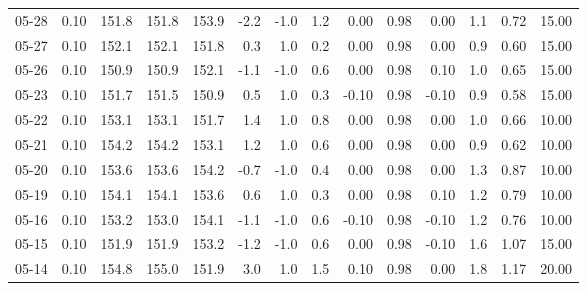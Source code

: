\begin{threeparttable}
{\begin{tabular}{lrrrrrrrrrrrrr}
  05-28 &     0.10 & 151.8 & 151.8 & 153.9 &       -2.2 &                     -1.0 &                 1.2 &       0.00 &      0.98 &           0.00 &              1.1 &            0.72 &                  15.00 \\
  05-27 &     0.10 & 152.1 & 152.1 & 151.8 &        0.3 &                      1.0 &                 0.2 &       0.00 &      0.98 &           0.00 &              0.9 &            0.60 &                  15.00 \\
  05-26 &     0.10 & 150.9 & 150.9 & 152.1 &       -1.1 &                     -1.0 &                 0.6 &       0.00 &      0.98 &           0.10 &              1.0 &            0.65 &                  15.00 \\
  05-23 &     0.10 & 151.7 & 151.5 & 150.9 &        0.5 &                      1.0 &                 0.3 &      -0.10 &      0.98 &          -0.10 &              0.9 &            0.58 &                  15.00 \\
  05-22 &     0.10 & 153.1 & 153.1 & 151.7 &        1.4 &                      1.0 &                 0.8 &       0.00 &      0.98 &           0.00 &              1.0 &            0.66 &                  10.00 \\
  05-21 &     0.10 & 154.2 & 154.2 & 153.1 &        1.2 &                      1.0 &                 0.6 &       0.00 &      0.98 &           0.00 &              0.9 &            0.62 &                  10.00 \\
  05-20 &     0.10 & 153.6 & 153.6 & 154.2 &       -0.7 &                     -1.0 &                 0.4 &       0.00 &      0.98 &           0.00 &              1.3 &            0.87 &                  10.00 \\
  05-19 &     0.10 & 154.1 & 154.1 & 153.6 &        0.6 &                      1.0 &                 0.3 &       0.00 &      0.98 &           0.10 &              1.2 &            0.79 &                  10.00 \\
  05-16 &     0.10 & 153.2 & 153.0 & 154.1 &       -1.1 &                     -1.0 &                 0.6 &      -0.10 &      0.98 &          -0.10 &              1.2 &            0.76 &                  10.00 \\
  05-15 &     0.10 & 151.9 & 151.9 & 153.2 &       -1.2 &                     -1.0 &                 0.6 &       0.00 &      0.98 &          -0.10 &              1.6 &            1.07 &                  15.00 \\
  05-14 &     0.10 & 154.8 & 155.0 & 151.9 &        3.0 &                      1.0 &                 1.5 &       0.10 &      0.98 &           0.00 &              1.8 &            1.17 &                  20.00 \\

\end{tabular}}
\end{threeparttable}
